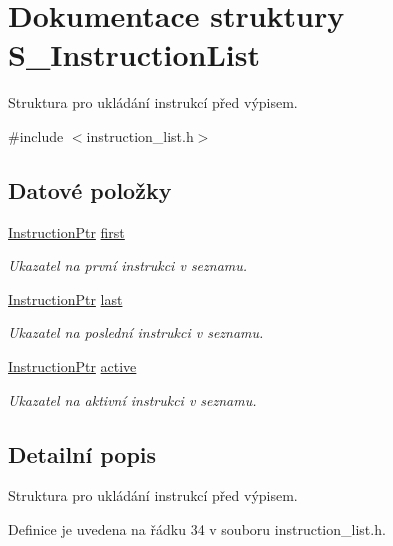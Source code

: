 \hypertarget{struct_s___instruction_list}{}\section{Dokumentace struktury S\+\_\+\+Instruction\+List}
\label{struct_s___instruction_list}


Struktura pro ukládání instrukcí před výpisem.  




{\ttfamily \#include $<$instruction\+\_\+list.\+h$>$}

\subsection*{Datové položky}
\begin{DoxyCompactItemize}
\item 
\hyperlink{instruction__list_8h_aaaf9f8ee3d7203e01ba5c651c5ee8a99}{Instruction\+Ptr} \hyperlink{struct_s___instruction_list_a7df20b4f50a6510587e6a392e73ea905}{first}
\begin{DoxyCompactList}\small\item\em Ukazatel na první instrukci v seznamu. \end{DoxyCompactList}\item 
\hyperlink{instruction__list_8h_aaaf9f8ee3d7203e01ba5c651c5ee8a99}{Instruction\+Ptr} \hyperlink{struct_s___instruction_list_af0c6bee15fdf9d372fdd4e24974fe110}{last}
\begin{DoxyCompactList}\small\item\em Ukazatel na poslední instrukci v seznamu. \end{DoxyCompactList}\item 
\hyperlink{instruction__list_8h_aaaf9f8ee3d7203e01ba5c651c5ee8a99}{Instruction\+Ptr} \hyperlink{struct_s___instruction_list_a49648a14a3944a473e7b5da00f20f600}{active}
\begin{DoxyCompactList}\small\item\em Ukazatel na aktivní instrukci v seznamu. \end{DoxyCompactList}\end{DoxyCompactItemize}


\subsection{Detailní popis}
Struktura pro ukládání instrukcí před výpisem. 

Definice je uvedena na řádku 34 v souboru instruction\+\_\+list.\+h.



